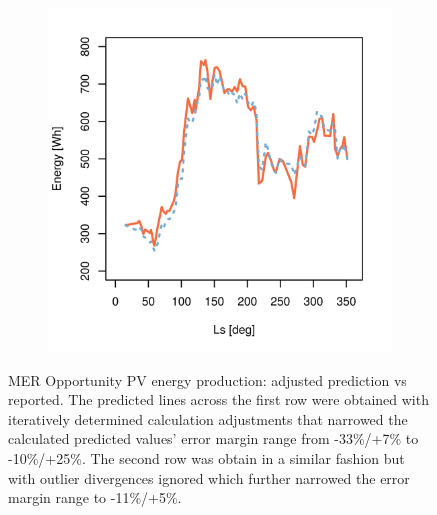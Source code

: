 \begin{figure}[h]
\begin{subfigure}[t]{\subfigureWidth}
		\label{fig:plot:sub:mer-energy-production-predicted-vs-reported-my30-adjusted-without-outliers}
	\end{subfigure}\hfill
    \begin{subfigure}[t]{\subfigureWidth}
        \centering
		\includegraphics[height=\graphicsHeight]{sections/appendix/B/plots/predicted-vs-measured-energy-my32-adjusted-without-outliers.png}
		\label{fig:plot:sub:mer-energy-production-predicted-vs-reported-my32-adjusted-without-outliers}
	\end{subfigure}
    \caption[MER Opportunity PV energy production: adjusted prediction vs reported]
            {MER Opportunity PV energy production: adjusted prediction vs reported. The predicted lines across the first row were obtained with iteratively determined calculation adjustments that narrowed the calculated predicted values' error margin range from -33\%/+7\% to -10\%/+25\%. The second row was obtain in a similar fashion but with outlier divergences ignored which further narrowed the error margin range to -11\%/+5\%.}
    \label{fig:plot:}
\vspace{-2ex}
\end{figure}
